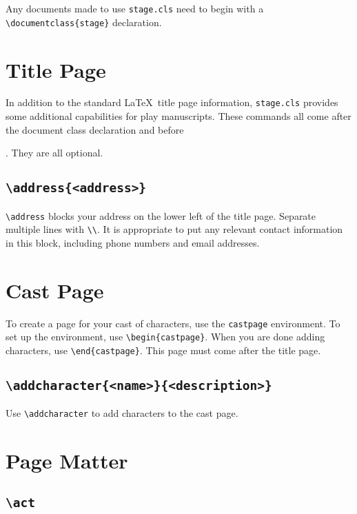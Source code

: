 \documentclass{report}
\begin{document}
Any documents made to use \texttt{stage.cls} need to begin with a \verb|\documentclass{stage}| declaration.

\section{Title Page}

In addition to the standard \LaTeX\ title page information, \texttt{stage.cls} provides some additional capabilities for play manuscripts. These commands all come after the document class declaration and before \maketitle. They are all optional.

\cprotect\subsection{\verb|\address{<address>}|}
\verb|\address| blocks your address on the lower left of the title page. Separate multiple lines with \verb|\\|. It is appropriate to put any relevant contact information in this block, including phone numbers and email addresses.

\section{Cast Page}

To create a page for your cast of characters, use the \texttt{castpage} environment. To set up the environment, use \verb|\begin{castpage}|. When you are done adding characters, use \verb|\end{castpage}|. This page must come after the title page.

\cprotect\subsection{\verb|\addcharacter{<name>}{<description>}|}
Use \verb|\addcharacter| to add characters to the cast page.

\section{Page Matter}

\cprotect\subsection{\verb|\act|}
\end{document}
